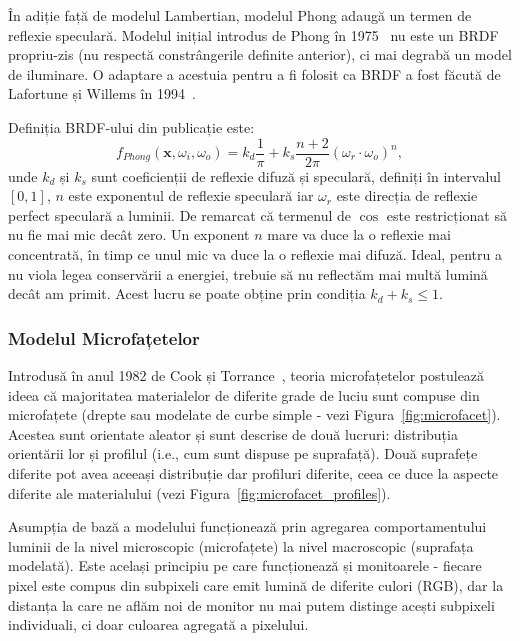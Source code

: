 \documentclass[12pt,a4paper]{report}
\numberwithin{equation}{section} %
\begin{document}
În adiție față de modelul Lambertian, modelul Phong adaugă un termen de reflexie
speculară. Modelul inițial introdus de Phong în 1975~\cite{Phong} nu este un BRDF
propriu-zis (nu respectă constrângerile definite anterior), ci mai degrabă un model de iluminare. O adaptare a acestuia pentru
a fi folosit ca BRDF a fost făcută de Lafortune și Willems în 1994~\cite{Lafortune}.

Definiția BRDF-ului din publicație este:
\begin{equation}\label{eq:phong}
	f_{Phong}(\mathbf{x}, \omega_i, \omega_o) = k_d\frac{1}{\pi} + k_s\frac{n + 2}{2\pi}(\omega_r \cdot \omega_o)^n,
\end{equation}
unde $k_d$ și $k_s$ sunt coeficienții de reflexie difuză și speculară, definiți
în intervalul $[0, 1]$, $n$ este exponentul de reflexie speculară iar $\omega_r$ este
direcția de reflexie perfect speculară a luminii. De remarcat că termenul de $\cos$
este restricționat să nu fie mai mic decât zero. Un exponent $n$ mare va duce la o
reflexie mai concentrată, în timp ce unul mic va duce la o reflexie mai difuză.
Ideal, pentru a nu viola legea conservării a energiei, trebuie să nu reflectăm mai multă lumină
decât am primit. Acest lucru se poate obține prin condiția $k_d + k_s \leq 1$.

\subsubsection*{Modelul Microfațetelor}
Introdusă în anul 1982 de Cook și Torrance~\cite{CookTorrance}, teoria microfațetelor postulează ideea că
majoritatea materialelor de diferite grade de luciu sunt compuse din microfațete
(drepte sau modelate de curbe simple - vezi Figura~\ref{fig:microfacet}). Acestea sunt orientate aleator și
sunt descrise de două lucruri: distribuția orientării lor și profilul (i.e.,
cum sunt dispuse pe suprafață). Două suprafețe diferite pot avea aceeași distribuție
dar profiluri diferite, ceea ce duce la aspecte diferite ale materialului (vezi Figura~\ref{fig:microfacet_profiles}).

Asumpția de bază a modelului funcționează prin agregarea comportamentului
luminii de la nivel microscopic (microfațete) la nivel macroscopic (suprafața modelată).
Este același principiu pe care funcționează și monitoarele - fiecare pixel este compus
din subpixeli care emit lumină de diferite culori (RGB), dar la distanța la care
ne aflăm noi de monitor nu mai putem distinge acești subpixeli individuali, ci doar
culoarea agregată a pixelului.
\end{document}
